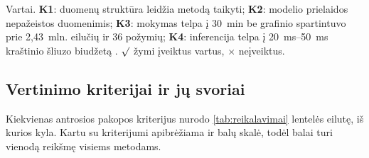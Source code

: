 \vspace{-0.5em}
{\footnotesize
Vartai.
\textbf{K1}: duomenų struktūra leidžia metodą taikyti;
\textbf{K2}: modelio prielaidos nepažeistos duomenimis;
\textbf{K3}: mokymas telpa į \SI{30}{\minute} be grafinio
spartintuvo prie 2,43~mln. eilučių ir 36 požymių;
\textbf{K4}: inferencija telpa į \SIrange{20}{50}{\milli\second}
kraštinio šliuzo biudžetą \cite{sallam2026gap}.
$\surd$ žymi įveiktus vartus, $\times$ neįveiktus.
\par}
\endgroup

\clearpage
\subsection{Vertinimo kriterijai ir jų svoriai}
\label{sec:kriterijai}

Kiekvienas antrosios pakopos kriterijus nurodo
\ref{tab:reikalavimai} lentelės eilutę, iš kurios kyla. Kartu su
kriterijumi apibrėžiama ir balų skalė, todėl balai turi vienodą reikšmę
visiems metodams.

%

